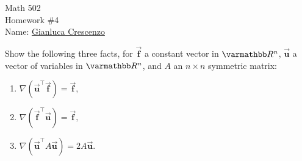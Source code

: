 \documentclass[10pt,oneside,openany]{memoir}
\begin{document}
\begin{center}
    {\Large Math 502 \\[0.1in]Homework \#4}\\[.175in]
    {Name:} {\underline{Gianluca Crescenzo\hspace*{2in}}}\\[0.15in]
    \end{center}
    \vspace{4pt}
\begin{exercise}[manual-num={4.0}]
Show the following three facts, for $\vec{\boldsymbol{f}}$ a constant vector in $\bfR^n$, $\vec{\boldsymbol{u}}$ a vector of variables in $\bfR^n$, and $A$ an $n \times n$ symmetric matrix:
\begin{enumerate}[label = (\alph*),itemsep=1pt,topsep=3pt]
    \item $\nabla(\vec{\boldsymbol{u}}^{\top}\vec{\boldsymbol{f}})=\vec{\boldsymbol{f}},$
    \item $\nabla(\vec{\boldsymbol{f}}^{\top}\vec{\boldsymbol{u}})=\vec{\boldsymbol{f}},$
    \item $\nabla(\vec{\boldsymbol{u}}^{\top}A\vec{\boldsymbol{u}})=2A\vec{\boldsymbol{u}}.$
\end{enumerate}
\end{exercise}
\end{document}
